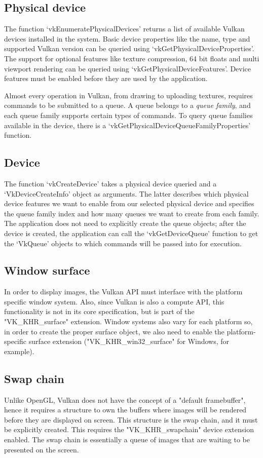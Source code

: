 \subsection{Physical device}
The function `vkEnumeratePhysicalDevices' returns a list of available Vulkan devices installed in the system. Basic device properties like the name, type and supported Vulkan version can be queried using `vkGetPhysicalDeviceProperties'. The support for optional features like texture compression, 64 bit floats and multi viewport rendering can be queried using `vkGetPhysicalDeviceFeatures'. Device features must be enabled before they are used by the application.

Almost every operation in Vulkan, from drawing to uploading textures, requires commands to be submitted to a queue. A queue belongs to a \emph{queue family}, and each queue family supports certain types of commands. To query queue families available in the device, there is a `vkGetPhysicalDeviceQueueFamilyProperties' function.

\subsection{Device}
The function `vkCreateDevice' takes a physical device queried and a `VkDeviceCreateInfo' object as arguments. The latter describes which physical device features we want to enable from our selected physical device and specifies the queue family index and how many queues we want to create from each family. The application does not need to explicitly create the queue objects; after the device is created, the application can call the `vkGetDeviceQueue' function to get the `VkQueue' objects to which commands will be passed into for execution.

\subsection{Window surface}
In order to display images, the Vulkan API must interface with the platform specific window system. Also, since Vulkan is also a compute API, this functionality is not in its core specification, but is part of the "VK\_KHR\_surface" extension. Window systems also vary for each platform so, in order to create the proper surface object, we also need to enable the platform-specific surface extension ("VK\_KHR\_win32\_surface" for Windows, for example).

\subsection{Swap chain}
Unlike OpenGL, Vulkan does not have the concept of a "default framebuffer", hence it requires a structure to own the buffers where images will be rendered before they are displayed on screen. This structure is the swap chain, and it must be explicitly created. This requires the "VK\_KHR\_swapchain" device extension enabled. The swap chain is essentially a queue of images that are waiting to be presented on the screen.


